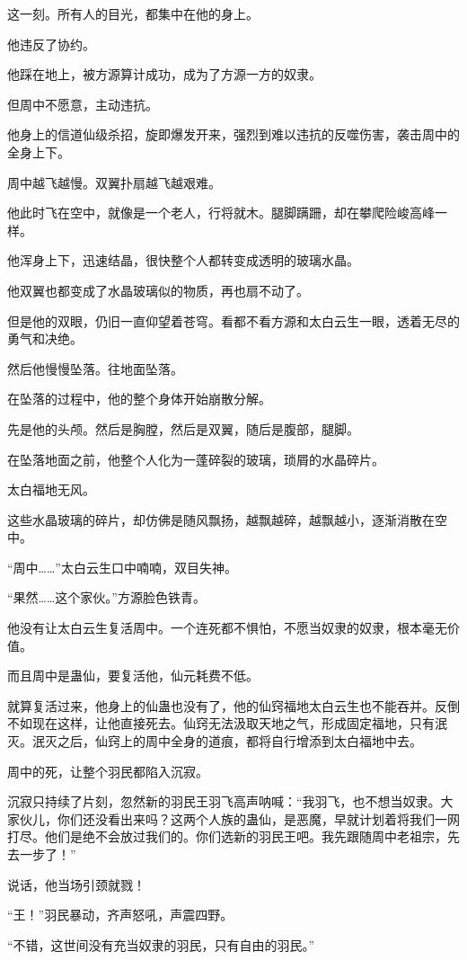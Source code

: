 \begin{this_body}
这一刻。所有人的目光，都集中在他的身上。

他违反了协约。

他踩在地上，被方源算计成功，成为了方源一方的奴隶。

但周中不愿意，主动违抗。

他身上的信道仙级杀招，旋即爆发开来，强烈到难以违抗的反噬伤害，袭击周中的全身上下。

周中越飞越慢。双翼扑扇越飞越艰难。

他此时飞在空中，就像是一个老人，行将就木。腿脚蹒跚，却在攀爬险峻高峰一样。

他浑身上下，迅速结晶，很快整个人都转变成透明的玻璃水晶。

他双翼也都变成了水晶玻璃似的物质，再也扇不动了。

但是他的双眼，仍旧一直仰望着苍穹。看都不看方源和太白云生一眼，透着无尽的勇气和决绝。

然后他慢慢坠落。往地面坠落。

在坠落的过程中，他的整个身体开始崩散分解。

先是他的头颅。然后是胸膛，然后是双翼，随后是腹部，腿脚。

在坠落地面之前，他整个人化为一蓬碎裂的玻璃，琐屑的水晶碎片。

太白福地无风。

这些水晶玻璃的碎片，却仿佛是随风飘扬，越飘越碎，越飘越小，逐渐消散在空中。

“周中……”太白云生口中喃喃，双目失神。

“果然……这个家伙。”方源脸色铁青。

他没有让太白云生复活周中。一个连死都不惧怕，不愿当奴隶的奴隶，根本毫无价值。

而且周中是蛊仙，要复活他，仙元耗费不低。

就算复活过来，他身上的仙蛊也没有了，他的仙窍福地太白云生也不能吞并。反倒不如现在这样，让他直接死去。仙窍无法汲取天地之气，形成固定福地，只有泯灭。泯灭之后，仙窍上的周中全身的道痕，都将自行增添到太白福地中去。

周中的死，让整个羽民都陷入沉寂。

沉寂只持续了片刻，忽然新的羽民王羽飞高声呐喊：“我羽飞，也不想当奴隶。大家伙儿，你们还没看出来吗？这两个人族的蛊仙，是恶魔，早就计划着将我们一网打尽。他们是绝不会放过我们的。你们选新的羽民王吧。我先跟随周中老祖宗，先去一步了！”

说话，他当场引颈就戮！

“王！”羽民暴动，齐声怒吼，声震四野。

“不错，这世间没有充当奴隶的羽民，只有自由的羽民。”


\end{this_body}
